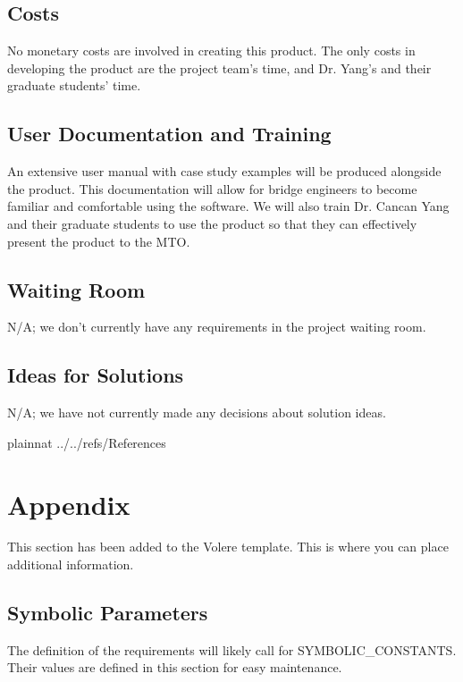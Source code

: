 \documentclass[12pt]{article}
\begin{document}
\subsection{Costs}

No monetary costs are involved in creating this product. The only costs in developing the product are the project team's time, and Dr. Yang's and their graduate students' time.

\subsection{User Documentation and Training}

An extensive user manual with case study examples will be produced alongside the product. This documentation will allow for bridge engineers to become familiar and comfortable using the software.
We will also train Dr. Cancan Yang and their graduate students to use the product so that they can effectively present the product to the MTO.

\subsection{Waiting Room}

N/A; we don't currently have any requirements in the project waiting room.

\subsection{Ideas for Solutions}

N/A; we have not currently made any decisions about solution ideas.

\newpage

 {plainnat}
 {../../refs/References}

\newpage

\section{Appendix}

This section has been added to the Volere template.  This is where you can place
additional information.

\subsection{Symbolic Parameters}

The definition of the requirements will likely call for SYMBOLIC\_CONSTANTS.
Their values are defined in this section for easy maintenance.
\end{document}
